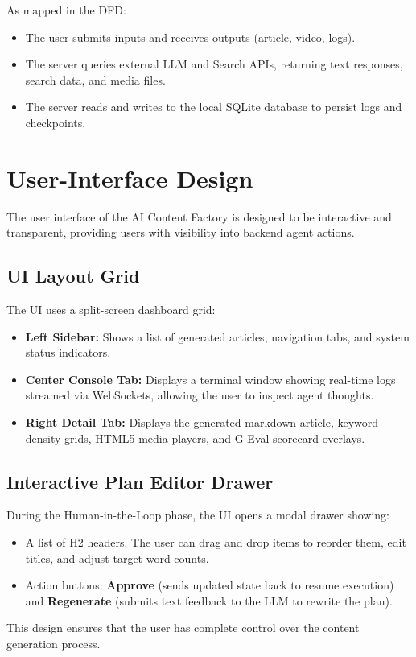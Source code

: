 As mapped in the DFD:
\begin{itemize}
    \item The user submits inputs and receives outputs (article, video, logs).
    \item The server queries external LLM and Search APIs, returning text responses, search data, and media files.
    \item The server reads and writes to the local SQLite database to persist logs and checkpoints.
\end{itemize}

\section{User-Interface Design}

The user interface of the AI Content Factory is designed to be interactive and transparent, providing users with visibility into backend agent actions.

\subsection{UI Layout Grid}
The UI uses a split-screen dashboard grid:
\begin{itemize}
    \item \textbf{Left Sidebar:} Shows a list of generated articles, navigation tabs, and system status indicators.
    \item \textbf{Center Console Tab:} Displays a terminal window showing real-time logs streamed via WebSockets, allowing the user to inspect agent thoughts.
    \item \textbf{Right Detail Tab:} Displays the generated markdown article, keyword density grids, HTML5 media players, and G-Eval scorecard overlays.
\end{itemize}

\subsection{Interactive Plan Editor Drawer}
During the Human-in-the-Loop phase, the UI opens a modal drawer showing:
\begin{itemize}
    \item A list of H2 headers. The user can drag and drop items to reorder them, edit titles, and adjust target word counts.
    \item Action buttons: \textbf{Approve} (sends updated state back to resume execution) and \textbf{Regenerate} (submits text feedback to the LLM to rewrite the plan).
\end{itemize}
This design ensures that the user has complete control over the content generation process.